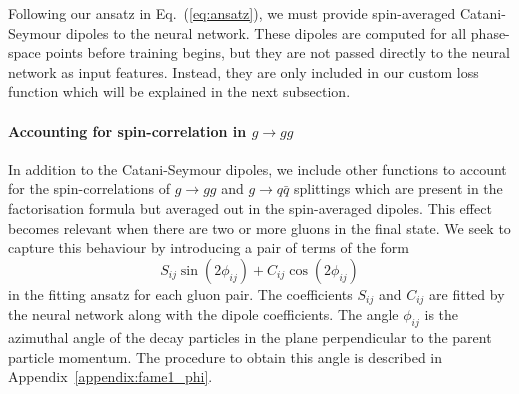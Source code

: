 \documentclass[main.tex]{subfiles}
\begin{document}
Following our ansatz in Eq.~(\ref{eq:ansatz}), we must provide spin-averaged Catani-Seymour dipoles to the neural network. These dipoles are computed for all phase-space points before training begins, but they are not passed directly to the neural network as input features. Instead, they are only included in our custom loss function which will be explained in the next subsection.

\paragraph*{Accounting for spin-correlation in $g \rightarrow gg$}
In addition to the Catani-Seymour dipoles, we include other functions to account for the spin-correlations of $g \rightarrow gg$ and $g \rightarrow q\bar q$ splittings which are present in the factorisation formula but averaged out in the spin-averaged dipoles.
This effect becomes relevant when there are two or more gluons in the final state.
We seek to capture this behaviour by introducing a pair of terms of the form 
\begin{equation}
S_{ij} \sin\left(2 \phi_{ij}\right) + C_{ij} \cos\left(2\phi_{ij}\right)
\end{equation}
in the fitting ansatz for each gluon pair. The coefficients $S_{ij}$ and $C_{ij}$ are fitted by the neural network along with the dipole coefficients. The angle $\phi_{ij}$ is the azimuthal angle of the decay particles in the plane perpendicular to the parent particle momentum. The procedure to obtain this angle is described in Appendix~\ref{appendix:fame1_phi}.
\end{document}
